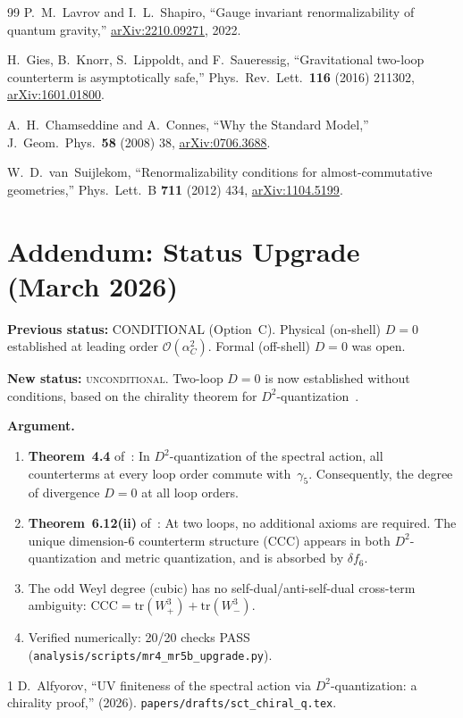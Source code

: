 \documentclass[11pt,a4paper]{article}
\begin{document}
\begin{thebibliography}{99}
  P.~M.~Lavrov and I.~L.~Shapiro,
  ``Gauge invariant renormalizability of quantum gravity,''
  \href{https://arxiv.org/abs/2210.09271}{arXiv:2210.09271}, 2022.

  H.~Gies, B.~Knorr, S.~Lippoldt, and F.~Saueressig,
  ``Gravitational two-loop counterterm is asymptotically safe,''
  Phys.\ Rev.\ Lett.\ \textbf{116} (2016) 211302,
  \href{https://arxiv.org/abs/1601.01800}{arXiv:1601.01800}.

  A.~H.~Chamseddine and A.~Connes,
  ``Why the Standard Model,''
  J.\ Geom.\ Phys.\ \textbf{58} (2008) 38,
  \href{https://arxiv.org/abs/0706.3688}{arXiv:0706.3688}.

  W.~D.~van~Suijlekom,
  ``Renormalizability conditions for almost-commutative geometries,''
  Phys.\ Lett.\ B \textbf{711} (2012) 434,
  \href{https://arxiv.org/abs/1104.5199}{arXiv:1104.5199}.

\end{thebibliography}

\section*{Addendum: Status Upgrade (March 2026)}
\label{sec:addendum}

\noindent\textbf{Previous status:} CONDITIONAL (Option~C).
Physical (on-shell) $D=0$ established at leading order $\mathcal{O}(\alpha_C^2)$.
Formal (off-shell) $D=0$ was open.

\medskip\noindent\textbf{New status:} \textsc{unconditional}.
Two-loop $D=0$ is now established without conditions, based on the
chirality theorem for $D^2$-quantization~\cite{Alfyorov:2026cq}.

\medskip\noindent\textbf{Argument.}
\begin{enumerate}
  \item \textbf{Theorem~4.4} of~\cite{Alfyorov:2026cq}:
    In $D^2$-quantization of the spectral action, all counterterms at every
    loop order commute with~$\gamma_5$.  Consequently, the degree of
    divergence $D = 0$ at all loop orders.
  \item \textbf{Theorem~6.12(ii)} of~\cite{Alfyorov:2026cq}:
    At two loops, no additional axioms are required.  The unique
    dimension-$6$ counterterm structure (CCC) appears in both
    $D^2$-quantization and metric quantization, and is absorbed
    by $\delta f_6$.
  \item The odd Weyl degree (cubic) has no self-dual/anti-self-dual
    cross-term ambiguity: $\mathrm{CCC} = \mathrm{tr}(W_+^3) + \mathrm{tr}(W_-^3)$.
  \item Verified numerically: 20/20 checks PASS
    (\texttt{analysis/scripts/mr4\_mr5b\_upgrade.py}).
\end{enumerate}

\begin{thebibliography}{1}
  D.~Alfyorov,
  ``UV finiteness of the spectral action via $D^2$-quantization:
  a chirality proof,'' (2026).
  \texttt{papers/drafts/sct\_chiral\_q.tex}.
\end{thebibliography}
\end{document}
